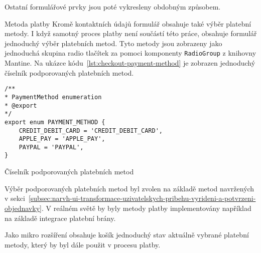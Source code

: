 Ostatní formulářové prvky jsou poté vykresleny obdobným způsobem.

\begin{subsection}{Metoda platby}
    \label{subsec:implementace-checkout-payment-method}
    Kromě kontaktních údajů formulář obsahuje také výběr platební metody.
    I když samotný proces platby není součástí této práce, obsahuje formulář jednoduchý výběr platebních metod.
    Tyto metody jsou zobrazeny jako jednoduchá skupina radio tlačítek za pomoci komponenty \texttt{RadioGroup} z knihovny Mantine.
    Na ukázce kódu~\ref{lst:checkout-payment-method} je zobrazen jednoduchý číselník podporovaných platebních metod.

    \begin{listing}[h]
        \begin{verbatim}
/**
* PaymentMethod enumeration
* @export
*/
export enum PAYMENT_METHOD {
	CREDIT_DEBIT_CARD = 'CREDIT_DEBIT_CARD',
	APPLE_PAY = 'APPLE_PAY',
	PAYPAL = 'PAYPAL',
}
        \end{verbatim}
        \caption{Číselník podporovaných platebních metod}
        \label{lst:checkout-payment-method}
    \end{listing}

    Výběr podporovaných platebních metod byl zvolen na základě metod navržených v sekci~\ref{subsec:narvh-ui-transformace-uzivatelskych-pribehu-vyrideni-a-potvrzeni-objednavky}.
    V reálném světě by byly metody platby implementovány například na základě integrace platební brány.

    Jako mikro rozšíření obsahuje košík jednoduchý stav aktuálně vybrané platební metody, který by byl dále použit v procesu platby.
\end{subsection}

